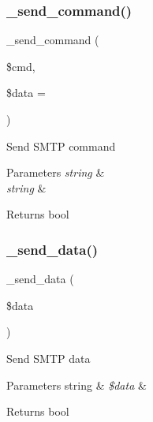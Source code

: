 \subsubsection{\texorpdfstring{\+\_\+send\+\_\+command()}{\_send\_command()}}
{\footnotesize\ttfamily \+\_\+send\+\_\+command (\begin{DoxyParamCaption}\item[{}]{\$cmd,  }\item[{}]{\$data = {\ttfamily \textquotesingle{}\textquotesingle{}} }\end{DoxyParamCaption})\hspace{0.3cm}{\ttfamily [protected]}}

Send S\+M\+TP command


\begin{DoxyParams}{Parameters}
{\em string} & \\
\hline
{\em string} & \\
\hline
\end{DoxyParams}
\begin{DoxyReturn}{Returns}
bool 
\end{DoxyReturn}
\mbox{\label{class_c_i___email_a42fa768e8678b3c1462762b9b812a302}} 
\subsubsection{\texorpdfstring{\+\_\+send\+\_\+data()}{\_send\_data()}}
{\footnotesize\ttfamily \+\_\+send\+\_\+data (\begin{DoxyParamCaption}\item[{}]{\$data }\end{DoxyParamCaption})\hspace{0.3cm}{\ttfamily [protected]}}

Send S\+M\+TP data


\begin{DoxyParams}[1]{Parameters}
string & {\em \$data} & \\
\hline
\end{DoxyParams}
\begin{DoxyReturn}{Returns}
bool 
\end{DoxyReturn}
\mbox{\label{class_c_i___email_ae7e626556c4d619a7214bee6056badd4}} 
